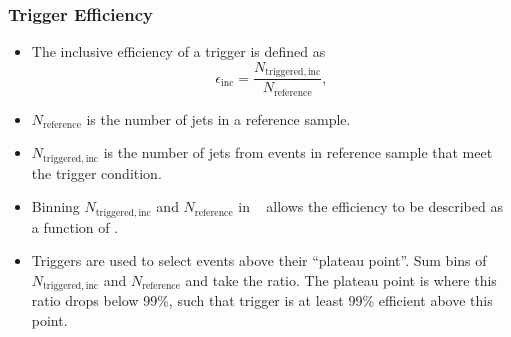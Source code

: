 \documentclass[10pt]{beamer}
\begin{document}
\begin{frame}\frametitle{Trigger Efficiency}
\begin{itemize}
\item The inclusive efficiency of a trigger is defined as 
\begin{equation*}
\epsilon_\mathrm{inc} = \frac{N_\mathrm{triggered,inc}}{N_\mathrm{reference}},
\end{equation*}
\item $N_\mathrm{reference}$ is the number of jets in a reference sample.
\item $N_\mathrm{triggered,inc}$ is the number of jets from events in reference sample that meet the trigger condition. \item Binning $N_\mathrm{triggered,inc}$ and $N_\mathrm{reference}$ in \pt~ allows the efficiency to be described as a function of \pt.

\item Triggers are used to select events above their ``plateau point''. Sum bins of $N_\mathrm{triggered,inc}$ and $N_\mathrm{reference}$ and take the ratio. The plateau point is where this ratio drops below 99\%, such that trigger is at least 99\% efficient above this point.
\end{itemize}
\end{frame}
\end{document}
